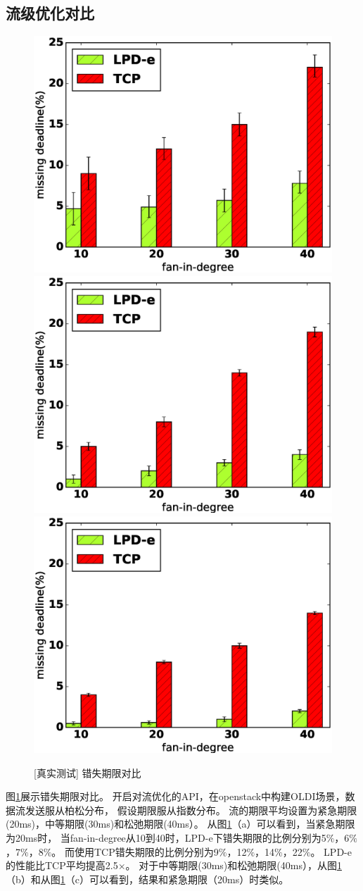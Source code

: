  \subsection{流级优化对比}
 \begin{figure}[h]
  \centering%
      {\includegraphics[width=0.33\columnwidth]{figures/others/20ms.eps}}
    {\includegraphics[width=0.33\columnwidth]{figures/others/30ms.eps}}%
    {\includegraphics[width=0.33\columnwidth]{figures/others/40ms.eps}}%

   \caption{[真实测试] 错失期限对比}
  \label{Yosemite-evaluation_deadline_fig}
\end{figure}

 图\ref{Yosemite-evaluation_deadline_fig}展示错失期限对比。
 开启对流优化的API，在openstack中构建OLDI场景，数据流发送服从柏松分布，
 假设期限服从指数分布。
 流的期限平均设置为紧急期限(20ms)，中等期限(30ms)和松弛期限(40ms）。
 从图\ref{Yosemite-evaluation_deadline_fig}（a）可以看到，当紧急期限为20ms时，
 当fan-in-degree从10到40时，LPD-e下错失期限的比例分别为5$\%$，6$\%$，7$\%$，8$\%$。
 而使用TCP错失期限的比例分别为9$\%$，12$\%$，14$\%$，22$\%$。
 LPD-e的性能比TCP平均提高2.5$\times$。
 对于中等期限(30ms)和松弛期限(40ms），从图\ref{Yosemite-evaluation_deadline_fig}（b）和从图\ref{Yosemite-evaluation_deadline_fig}（c）可以看到，结果和紧急期限（20ms）时类似。
 
